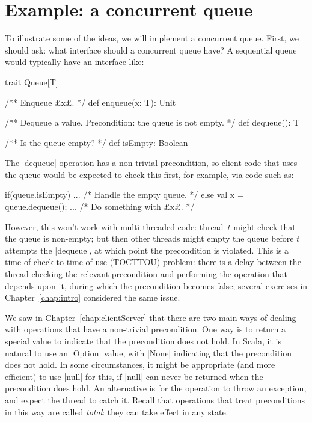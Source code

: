 
\section{Example: a concurrent queue}
\label{sec:total-queue}

To illustrate some of the ideas, we will implement a concurrent queue.  First,
we should ask: what interface should a concurrent queue have?  A sequential
queue would typically have an interface like:
%
\begin{scala}
trait Queue[T]{
  /** Enqueue £x£. */
  def enqueue(x: T): Unit

  /** Dequeue a value.  Precondition: the queue is not empty. */
  def dequeue(): T

  /** Is the queue empty? */
  def isEmpty: Boolean
}
\end{scala}
%
The |dequeue| operation has a non-trivial precondition, so client code that
uses the queue would be expected to check this first, for example, via code
such as:
\begin{scala}
  if(queue.isEmpty){ ... /* Handle the empty queue. */ } 
  else{ val x = queue.dequeue(); ... /* Do something with £x£. */ }
\end{scala}

However, this won't work with multi-threaded code: thread~$t$ might check that
the queue is non-empty; but then other threads might empty the queue before
$t$ attempts the |dequeue|, at which point the precondition is violated.  This
is a time-of-check to time-of-use (TOCTTOU) problem: there is a delay between
the thread checking the relevant precondition and performing the operation that
depends upon it, during  which the precondition becomes false; several
exercises in Chapter~\ref{chap:intro} considered the same issue.

We saw in Chapter~\ref{chap:clientServer} that there are two main ways of
dealing with operations that have a non-trivial precondition.  One way is to
return a special value to indicate that the precondition does not hold.  In
Scala, it is natural to use an |Option| value, with |None| indicating that the
precondition does not hold.  In some circumstances, it might be appropriate
(and more efficient) to use |null| for this, if |null| can never be returned
when the precondition does hold.  An alternative is for the operation to throw
an exception, and expect the thread to catch it.  Recall that operations that
treat preconditions in this way are called \emph{total}: they can take effect
in any state.

